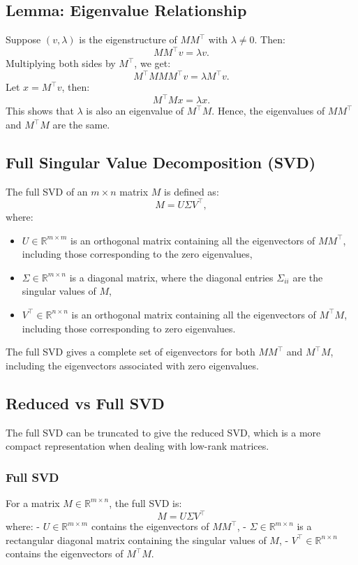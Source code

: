 \documentclass{article}
\begin{document}
\subsection{Lemma: Eigenvalue Relationship}
Suppose \( (v, \lambda) \) is the eigenstructure of \( M M^\top \) with \( \lambda \neq 0 \). Then:
\[
M M^\top v = \lambda v.
\]
Multiplying both sides by \( M^\top \), we get:
\[
M^\top M M M^\top v = \lambda M^\top v.
\]
Let \( x = M^\top v \), then:
\[
M^\top M x = \lambda x.
\]
This shows that \( \lambda \) is also an eigenvalue of \( M^\top M \). Hence, the eigenvalues of \( M M^\top \) and \( M^\top M \) are the same.

\subsection{Full Singular Value Decomposition (SVD)}
The full SVD of an \( m \times n \) matrix \( M \) is defined as:
\[
M = U \Sigma V^\top,
\]
where:
\begin{itemize}
    \item \( U \in \mathbb{R}^{m \times m} \) is an orthogonal matrix containing all the eigenvectors of \( M M^\top \), including those corresponding to the zero eigenvalues,
    \item \( \Sigma \in \mathbb{R}^{m \times n} \) is a diagonal matrix, where the diagonal entries \( \Sigma_{ii} \) are the singular values of \( M \),
    \item \( V^\top \in \mathbb{R}^{n \times n} \) is an orthogonal matrix containing all the eigenvectors of \( M^\top M \), including those corresponding to zero eigenvalues.
\end{itemize}
The full SVD gives a complete set of eigenvectors for both \( M M^\top \) and \( M^\top M \), including the eigenvectors associated with zero eigenvalues.

\subsection{Reduced vs Full SVD}
The full SVD can be truncated to give the reduced SVD, which is a more compact representation when dealing with low-rank matrices.

\subsubsection{Full SVD}
For a matrix \( M \in \mathbb{R}^{m \times n} \), the full SVD is:
\[
M = U \Sigma V^\top
\]
where:
- \( U \in \mathbb{R}^{m \times m} \) contains the eigenvectors of \( M M^\top \),
- \( \Sigma \in \mathbb{R}^{m \times n} \) is a rectangular diagonal matrix containing the singular values of \( M \),
- \( V^\top \in \mathbb{R}^{n \times n} \) contains the eigenvectors of \( M^\top M \).
\end{document}
